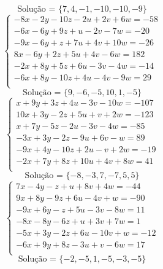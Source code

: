 \documentclass[12pt,oneside,a4paper]{article}
\begin{document}
\begin{equation*}
\text{Solução = }\{7,4,-1,-10,-10,-9\}
\end{equation*}
\vspace{\baselineskip}
\begin{equation*}
\begin{cases}
-8x-2y-10z-2u+2v+6w=-58 \\
-6x-6y+9z+u-2v-7w=-20 \\
-9x-6y+z+7u+4v+10w=-26 \\
8x-6y+2z+5u+4v-6w=182 \\
-2x+8y+5z+6u-3v-4w=-14 \\
-6x+8y-10z+4u-4v-9w=29 \\
\end{cases}
\end{equation*}
\begin{equation*}
\text{Solução = }\{9,-6,-5,10,1,-5\}
\end{equation*}
\vspace{\baselineskip}
\begin{equation*}
\begin{cases}
x+9y+3z+4u-3v-10w=-107 \\
10x+3y-2z+5u+v+2w=-123 \\
x+7y-5z-2u-3v-4w=-85 \\
-3x+3y-2z-9u+6v-w=89 \\
-9x+4y-10z+2u-v+2w=-19 \\
-2x+7y+8z+10u+4v+8w=41 \\
\end{cases}
\end{equation*}
\begin{equation*}
\text{Solução = }\{-8,-3,7,-7,5,5\}
\end{equation*}
\vspace{\baselineskip}
\begin{equation*}
\begin{cases}
7x-4y-z+u+8v+4w=-44 \\
9x+8y-9z+6u-4v+w=-90 \\
-9x+6y-z+5u-3v-8w=11 \\
-8x-8y-6z+u+3v+7w=1 \\
-5x+3y-2z+6u-10v+w=-12 \\
-6x+9y+8z-3u+v-6w=17 \\
\end{cases}
\end{equation*}
\begin{equation*}
\text{Solução = }\{-2,-5,1,-5,-3,-5\}
\end{equation*}
\end{document}
